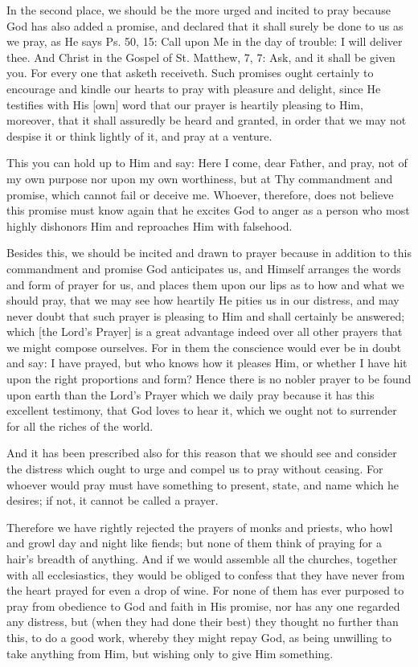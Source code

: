 In the second place, we should be the more urged and incited to pray
because God has also added a promise, and declared that it shall surely
be done to us as we pray, as He says Ps. 50, 15: Call upon Me in the
day of trouble: I will deliver thee. And Christ in the Gospel of St.
Matthew, 7, 7: Ask, and it shall be given you. For every one that
asketh receiveth. Such promises ought certainly to encourage and kindle
our hearts to pray with pleasure and delight, since He testifies with
His [own] word that our prayer is heartily pleasing to Him, moreover,
that it shall assuredly be heard and granted, in order that we may not
despise it or think lightly of it, and pray at a venture.

This you can hold up to Him and say: Here I come, dear Father, and
pray, not of my own purpose nor upon my own worthiness, but at Thy
commandment and promise, which cannot fail or deceive me. Whoever,
therefore, does not believe this promise must know again that he
excites God to anger as a person who most highly dishonors Him and
reproaches Him with falsehood.

Besides this, we should be incited and drawn to prayer because in
addition to this commandment and promise God anticipates us, and
Himself arranges the words and form of prayer for us, and places them
upon our lips as to how and what we should pray, that we may see how
heartily He pities us in our distress, and may never doubt that such
prayer is pleasing to Him and shall certainly be answered; which [the
Lord's Prayer] is a great advantage indeed over all other prayers that
we might compose ourselves. For in them the conscience would ever be in
doubt and say: I have prayed, but who knows how it pleases Him, or
whether I have hit upon the right proportions and form? Hence there is
no nobler prayer to be found upon earth than the Lord's Prayer which we
daily pray because it has this excellent testimony, that God loves to
hear it, which we ought not to surrender for all the riches of the
world.

And it has been prescribed also for this reason that we should see and
consider the distress which ought to urge and compel us to pray without
ceasing. For whoever would pray must have something to present, state,
and name which he desires; if not, it cannot be called a prayer.

Therefore we have rightly rejected the prayers of monks and priests,
who howl and growl day and night like fiends; but none of them think of
praying for a hair's breadth of anything. And if we would assemble all
the churches, together with all ecclesiastics, they would be obliged to
confess that they have never from the heart prayed for even a drop of
wine. For none of them has ever purposed to pray from obedience to God
and faith in His promise, nor has any one regarded any distress, but
(when they had done their best) they thought no further than this, to
do a good work, whereby they might repay God, as being unwilling to
take anything from Him, but wishing only to give Him something.

